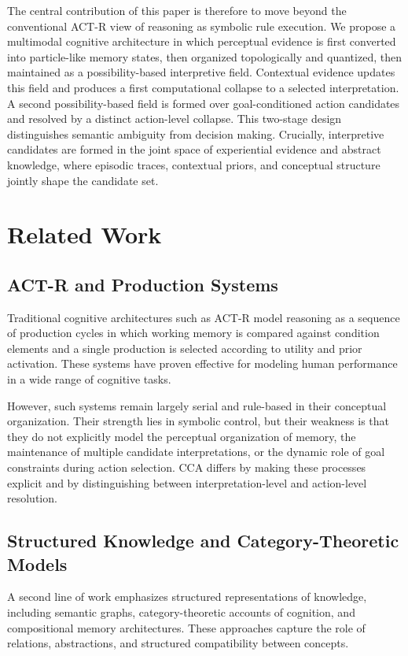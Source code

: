 \documentclass[10pt,journal,compsoc]{IEEEtran}
\begin{document}
The central contribution of this paper is therefore to move beyond the conventional ACT-R view of reasoning as symbolic rule execution. We propose a multimodal cognitive architecture in which perceptual evidence is first converted into particle-like memory states, then organized topologically and quantized, then maintained as a possibility-based interpretive field. Contextual evidence updates this field and produces a first computational collapse to a selected interpretation. A second possibility-based field is formed over goal-conditioned action candidates and resolved by a distinct action-level collapse. This two-stage design distinguishes semantic ambiguity from decision making. Crucially, interpretive candidates are formed in the joint space of experiential evidence and abstract knowledge, where episodic traces, contextual priors, and conceptual structure jointly shape the candidate set.

\section{Related Work}
\subsection{ACT-R and Production Systems}

Traditional cognitive architectures such as ACT-R model reasoning as a sequence of production cycles in which working memory is compared against condition elements and a single production is selected according to utility and prior activation. These systems have proven effective for modeling human performance in a wide range of cognitive tasks.

However, such systems remain largely serial and rule-based in their conceptual organization. Their strength lies in symbolic control, but their weakness is that they do not explicitly model the perceptual organization of memory, the maintenance of multiple candidate interpretations, or the dynamic role of goal constraints during action selection. CCA differs by making these processes explicit and by distinguishing between interpretation-level and action-level resolution.

\subsection{Structured Knowledge and Category-Theoretic Models}

A second line of work emphasizes structured representations of knowledge, including semantic graphs, category-theoretic accounts of cognition, and compositional memory architectures. These approaches capture the role of relations, abstractions, and structured compatibility between concepts.
\end{document}
